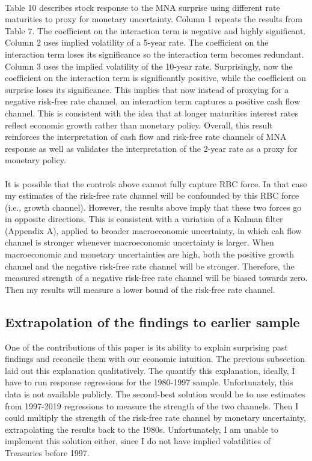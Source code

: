 \documentclass[12pt]{article}
\begin{document}
\paragraph{}
Table 10 describes stock response to the MNA surprise using different rate maturities to proxy for monetary uncertainty. Column 1 repeats the results from Table 7. The coefficient on the interaction term is negative and highly significant. Column 2 uses implied volatility of a 5-year rate. The coefficient on the interaction term loses its significance so the interaction term becomes redundant. Column 3 uses the implied volatility of the 10-year rate. Surprisingly, now the coefficient on the interaction term is significantly positive, while the coefficient on surprise loses its significance. This implies that now instead of proxying for a negative risk-free rate channel, an interaction term captures a positive cash flow channel. This is consistent with the idea that at longer maturities interest rates reflect economic growth rather than monetary policy. Overall, this result reinforces the interpretation of cash flow and risk-free rate channels of MNA response as well as validates the interpretation of the 2-year rate as a proxy for monetary policy.
\paragraph{}
It is possible that the controls above cannot fully capture RBC force. In that case my estimates of the risk-free rate channel will be confounded by this RBC force (i.e., growth channel). However, the results above imply that these two forces go in opposite directions. This is consistent with a variation of a Kalman filter (Appendix A), applied to broader macroeconomic uncertainty, in which cah flow channel is stronger whenever macroeconomic uncertainty is larger. When macroeconomic and monetary uncertainties are high, both the positive growth channel and the negative risk-free rate channel will be stronger. Therefore, the measured strength of a negative risk-free rate channel will be biased towards zero. Then my results will measure a lower bound of the risk-free rate channel.

\subsection{Extrapolation of the findings to earlier sample} 
\label{sec:Model}

One of the contributions of this paper is its ability to explain surprising past findings and reconcile them with our economic intuition. The previous subsection laid out this explanation qualitatively. The quantify this explanation, ideally, I have to run response regressions for the 1980-1997 sample. Unfortunately, this data is not available publicly. The second-best solution would be to use estimates from 1997-2019 regressions to measure the strength of the two channels. Then I could multiply the strength of the risk-free rate channel by monetary uncertainty, extrapolating the results back to the 1980s. Unfortunately, I am unable to implement this solution either, since I do not have implied volatilities of Treasuries before 1997.
\end{document}
